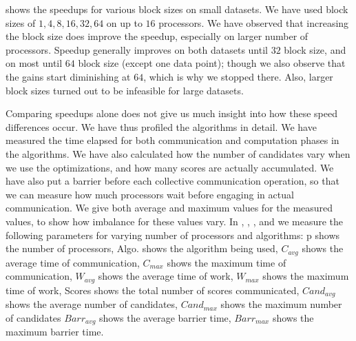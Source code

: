 \documentclass{comjnl}
\begin{document}
 shows the speedups for
various block sizes on small datasets. We have used block sizes of
$1,4,8,16,32,64$ on up to $16$ processors.
We have observed that increasing the
block size does improve the speedup, especially on larger number of
processors. Speedup generally improves on
both datasets until $32$ block size, and on most until $64$ block
size (except one data point); 
though we also observe that the gains start diminishing at $64$,
which is why we stopped there. Also, 
larger block sizes turned out to be infeasible for large datasets.


Comparing speedups alone does not give us much insight into how these
speed differences occur. We have thus profiled the algorithms in
detail. We have measured the time elapsed for both communication and
computation phases in the algorithms. We have also calculated how the
number of candidates vary when we use the optimizations, and how many
scores are actually accumulated. We have also put a barrier before
each collective communication operation, so that we can measure how
much processors wait before engaging in actual communication. We give
both average and maximum values for the measured values, to show how
imbalance for these values vary. In ,
,
, and
 we measure the following
parameters for varying number of processors and algorithms: p shows
the number of processors, Algo. shows the algorithm being used,
$C_{avg}$ shows the average time of communication, $C_{max}$ shows the
maximum time of communication, $W_{avg}$ shows the average time of
work, $W_{max}$ shows the maximum time of work, Scores shows the total
number of scores communicated, $Cand_{avg}$ shows the average number
of candidates, $Cand_{max}$ shows the maximum number of candidates
$Barr_{avg}$ shows the average barrier time, $Barr_{max}$ shows the
maximum barrier time.
\end{document}
